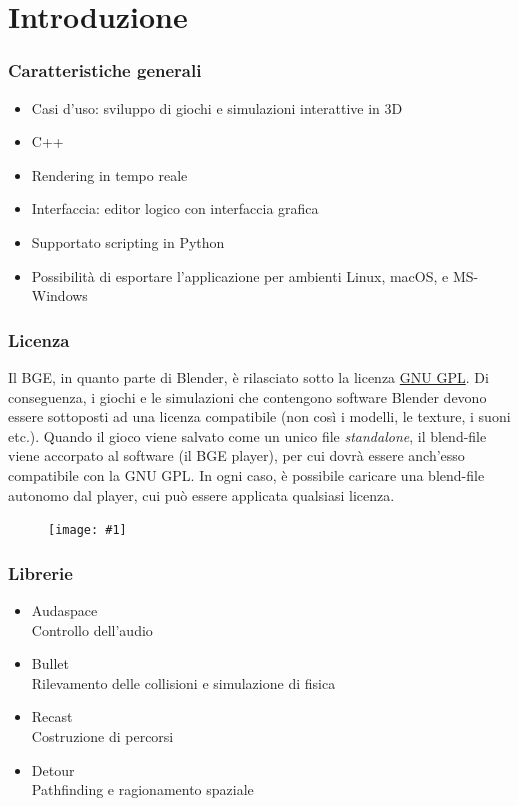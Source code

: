 \documentclass{beamer}
\def\image[#1][#2]{
	\begin{figure}[H]
		\centering
		\texttt{[image: \#1]}
\end{figure}}
\begin{document}
	\section{Introduzione}
		\begin{frame}
			\frametitle{Caratteristiche generali}
			\begin{itemize}
				\item Casi d'uso: sviluppo di giochi e simulazioni interattive in 3D 
				\item C++
				\item Rendering in tempo reale
				\item Interfaccia: editor logico con interfaccia grafica 
				\item Supportato scripting in Python
				\item Possibilità di esportare l'applicazione per ambienti Linux, macOS, e MS-Windows
			\end{itemize}
		\end{frame}
		\begin{frame}
			\frametitle{Licenza}
			Il BGE, in quanto parte di Blender, è rilasciato sotto la licenza \hyperlink{https://www.gnu.org/licenses/gpl-3.0.en.html}{\textcolor{BlenderOrange}{GNU GPL}}. Di conseguenza, i giochi e le simulazioni che contengono software Blender devono essere sottoposti ad una licenza compatibile (non così i modelli, le texture, i suoni etc.).
			Quando il gioco viene salvato come un unico file \textit{standalone}, il blend-file viene accorpato al software (il BGE player), per cui dovrà essere anch'esso compatibile con la GNU GPL. In ogni caso, è possibile caricare una blend-file autonomo dal player, cui può essere applicata qualsiasi licenza.
			\image[images/gpl.png][scale=0.4]
		\end{frame}
		\begin{frame}
			\frametitle{Librerie}
			\begin{itemize}
				\item Audaspace \\ {\footnotesize\hspace{1em} Controllo dell'audio}
				\item Bullet \\ {\footnotesize\hspace{1em} Rilevamento delle collisioni e simulazione di fisica} 
				\item Recast \\ {\footnotesize\hspace{1em} Costruzione di percorsi}
				\item Detour \\ {\footnotesize\hspace{1em} Pathfinding e ragionamento spaziale}
			\end{itemize}
		\end{frame}
\end{document}
